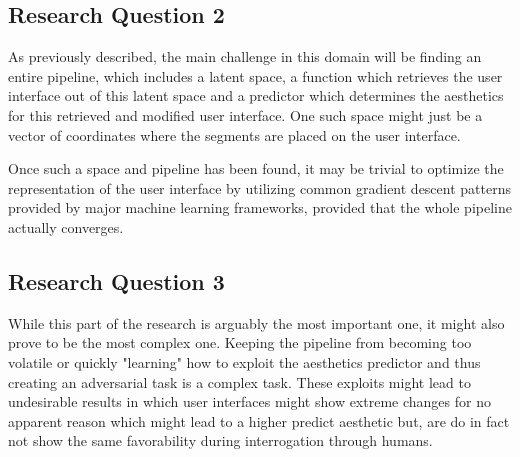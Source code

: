 \documentclass[10pt,a4paper]{scrartcl} %
\begin{document}
\subsection{Research Question 2}
As previously described, the main challenge in this domain will be finding an entire pipeline, which includes a latent space, a
function which retrieves the user interface out of this latent space and a predictor which determines the aesthetics for this
retrieved and modified user interface. One such space might just be a vector of coordinates where the segments are placed on
the user interface. 

Once such a space and pipeline has been found, it may be trivial to optimize the representation of the user interface by utilizing
common gradient descent patterns provided by major machine learning frameworks, provided that the whole pipeline actually converges.




%
%
%
\subsection{Research Question 3}
While this part of the research is arguably the most important one, it might also prove to be the most complex one.
Keeping the pipeline from becoming too volatile or quickly "learning" how to exploit the aesthetics predictor and thus
creating an adversarial task is a complex task. These exploits might lead to undesirable results in which user interfaces
might show extreme changes for no apparent reason which might lead to a higher predict aesthetic but, are do in fact not show
the same favorability during interrogation through humans.
\end{document}
